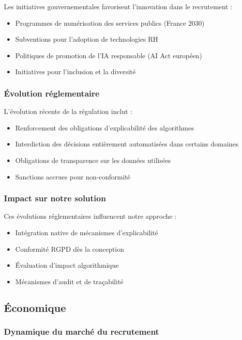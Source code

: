 \documentclass[12pt,a4paper]{report}
\begin{document}
Les initiatives gouvernementales favorisent l'innovation dans le recrutement :
\begin{itemize}
\item Programmes de numérisation des services publics (France 2030)
\item Subventions pour l'adoption de technologies RH
\item Politiques de promotion de l'IA responsable (AI Act européen)
\item Initiatives pour l'inclusion et la diversité
\end{itemize}

\subsubsection{Évolution réglementaire}

L'évolution récente de la régulation inclut :
\begin{itemize}
\item Renforcement des obligations d'explicabilité des algorithmes
\item Interdiction des décisions entièrement automatisées dans certains domaines
\item Obligations de transparence sur les données utilisées
\item Sanctions accrues pour non-conformité
\end{itemize}

\subsubsection{Impact sur notre solution}

Ces évolutions réglementaires influencent notre approche :
\begin{itemize}
\item Intégration native de mécanismes d'explicabilité
\item Conformité RGPD dès la conception
\item Évaluation d'impact algorithmique
\item Mécanismes d'audit et de traçabilité
\end{itemize}

\subsection{Économique}

\subsubsection{Dynamique du marché du recrutement}
\end{document}
